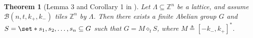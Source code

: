 \documentclass[sort&compress]{elsarticle}
\DeclarePairedDelimiter\parenv{\lparen}{\rparen}
\newcommand{\cB}{\mathcal{B}}
\renewcommand{\leq}{\leqslant}
\newtheorem{theorem}{Theorem}
\newcommand{\Z}{\mathbb{Z}}
\newcommand{\ve}{\mathbf{e}}
\newcommand{\vv}{\mathbf{v}}
\newcommand{\vx}{\mathbf{x}}
\newcommand{\Zero}{{\mathbf{0}}}
\DeclareMathOperator{\wt}{wt}
\newcommand{\kp}{k_+}
\newcommand{\km}{k_-}
\newcommand{\eqdef}{\triangleq}
\newcommand{\splt}{\diamond}
\begin{document}

\begin{theorem}[Lemma 3 and Corollary 1 in \cite{BuzEtz12}]
  \label{th:tiletolat}
  Let $\Lambda\subseteq\Z^n$ be a lattice, and assume
  $\cB(n,t,\kp,\km)$ tiles $\Z^n$ by $\Lambda$. Then there exists a
  finite Abelian group $G$ and $S=\set*{s_1,s_2,\dots,s_n}\subseteq G$
  such that $G=M\splt_t S$, where $M\eqdef [-\km,\kp]^*$.
\end{theorem}


\end{document}
